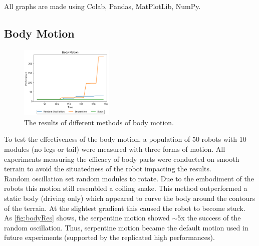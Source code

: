 \documentclass{article}
\begin{document}
All graphs are made using Colab, \citep{colab} Pandas, \citep{pd} MatPlotLib, \citep{plt} NumPy. \citep{np}

\subsection{Body Motion}
\label{sec:Body Res}
\begin{figure}
    \centering
    \vspace*{-5mm}
    \includegraphics[width=0.4\textwidth]{bodyResults}
    \vspace*{-7mm}
    \caption{The results of different methods of body motion.}
    \label{fig:bodyRes}
\end{figure}
To test the effectiveness of the body motion, a population of 50 robots with 10 modules (no legs or tail) were measured with three forms of motion. All experiments measuring the efficacy of body parts were conducted on smooth terrain to avoid the situatedness of the robot impacting the results.\\
Random oscillation set random modules to rotate. Due to the embodiment of the robots this motion still resembled a coiling snake. This method outperformed a static body (driving only) which appeared to curve the body around the contours of the terrain. At the slightest gradient this caused the robot to become stuck. \\
As \autoref{fig:bodyRes} shows, the serpentine motion showed $\sim$5x the success of the random oscillation. Thus, serpentine motion became the default motion used in future experiments (supported by the replicated high performances). 
\end{document}
